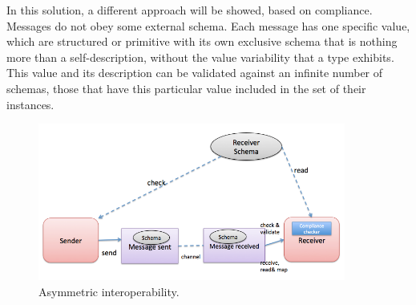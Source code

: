 In this solution, a different approach will be showed, based on compliance. Messages do not obey some external schema. Each message has one specific value, which are structured or primitive with its own exclusive schema that is nothing more than a self-description, without the value variability that a type exhibits. This value and its description can be validated against an infinite number of schemas, those that have this particular value included in the set of their instances.\\
\begin{figure}[!htb]
 \centering
 \includegraphics[width=0.9\textwidth]{Figures/asyc.png}
 \caption[Asymmetric interoperability.]{Asymmetric interoperability.}
 \label{fig:Asymmetric}
\end{figure}

